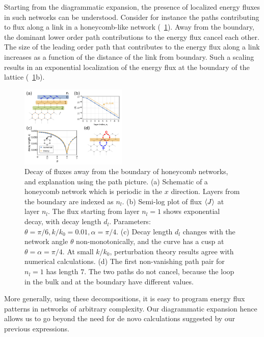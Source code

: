\documentclass[
 preprint,
 preprintnumbers,
 amsmath,amssymb,
 aps,
 pre,
 longbibliography,
 superscriptaddress,
 10pt, twocolumn
]{revtex4-1}
\begin{document}
Starting from the  diagrammatic expansion, the presence of localized energy fluxes in such networks can be understood. Consider for instance the paths contributing to flux along a link in a honeycomb-like network (\figurename~\ref{fig:path_decay}). Away from the boundary, the dominant lower order path contributions to the energy flux cancel each other. The size of the leading order path that contributes to the energy flux along a link increases as a function of the distance of the link from boundary. Such a scaling results in an exponential localization of the energy flux at the boundary of the lattice (\figurename~\ref{fig:path_decay}b). 
\begin{figure}[ht]
	\centering
	\includegraphics[width=0.45\textwidth]{5_path_decay.pdf}
    \caption{Decay of fluxes away from the boundary of honeycomb networks, and explanation using the path picture.
    (a) Schematic of a honeycomb network which is periodic in the $x$ direction. Layers from the boundary are indexed as $n_l$.
    (b) Semi-log plot of flux $\expval{J}$ at layer $n_l$. The flux starting from layer $n_l=1$ shows exponential decay, with decay length $d_l$. Parameters: $\theta = \pi/6, k/k_0 = 0.01, \alpha = \pi/4$.
    (c) Decay length $d_l$ changes with the network angle $\theta$ non-monotonically, and the curve has a cusp at $\theta = \alpha = \pi/4$. At small $k/k_0$, perturbation theory results agree with numerical calculations.
    (d) The first non-vanishing path pair for $n_l=1$ has length $7$. The two paths do not cancel, because the loop in the bulk and at the boundary have different values.
    }
    \label{fig:path_decay}
\end{figure}

More generally, using these decompositions, it is easy to program energy flux patterns in networks of arbitrary complexity. Our diagrammatic expansion hence allows us to go beyond the need for de novo calculations suggested by our previous expressions. 

\end{document}
